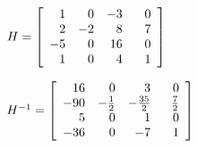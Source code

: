 \documentclass{ximera}
\begin{document}
\begin{question}
\begin{problem}\label{findmatinverselast}
$H = \left[ \begin{array}{rrrr} 1 & 0 & -3 & \hphantom{-}0 \\ 2 & -2 & 8 & 7 \\ -5 & 0 & 16 & 0 \\ 1 & 0 & 4 & 1 \end{array} \right]$

\begin{solution}
$H^{-1} = \left[ \begin{array}{rrrr} 16 & 0 & 3 & 0 \\  -90 & -\frac{1}{2} & -\frac{35}{2} & \frac{7}{2} \\  5 & 0 & 1 & 0 \\  -36 & 0 & -7 & \hphantom{-}1 \end{array} \right]$
\end{solution}
\end{problem}

\end{question}
\end{document}
